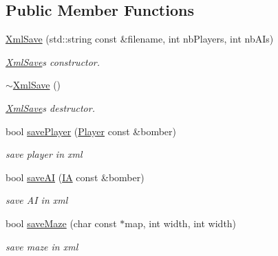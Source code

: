 \subsection*{Public Member Functions}
\begin{DoxyCompactItemize}
\item 
\hyperlink{class_xml_save_a84029bc40fae8324d683821b9013b9f5}{Xml\+Save} (std\+::string const \&filename, int nb\+Players, int nb\+A\+Is)
\begin{DoxyCompactList}\small\item\em \hyperlink{class_xml_save}{Xml\+Save}\textquotesingle{}s constructor. \end{DoxyCompactList}\item 
\hypertarget{class_xml_save_a87ca85b8767070250050f04dc5d539a4}{}\hyperlink{class_xml_save_a87ca85b8767070250050f04dc5d539a4}{$\sim$\+Xml\+Save} ()\label{class_xml_save_a87ca85b8767070250050f04dc5d539a4}

\begin{DoxyCompactList}\small\item\em \hyperlink{class_xml_save}{Xml\+Save}\textquotesingle{}s destructor. \end{DoxyCompactList}\item 
bool \hyperlink{class_xml_save_a81baea0e33b9f7d85b1eed8e868cd0d8}{save\+Player} (\hyperlink{class_player}{Player} const \&bomber)
\begin{DoxyCompactList}\small\item\em save player in xml \end{DoxyCompactList}\item 
bool \hyperlink{class_xml_save_a33586de72e77757f2c8ec06f98666e9b}{save\+A\+I} (\hyperlink{class_i_a}{I\+A} const \&bomber)
\begin{DoxyCompactList}\small\item\em save A\+I in xml \end{DoxyCompactList}\item 
bool \hyperlink{class_xml_save_a25c1aef0c3bc8589dc7224c332a792a1}{save\+Maze} (char const $\ast$map, int width, int width)
\begin{DoxyCompactList}\small\item\em save maze in xml \end{DoxyCompactList}\end{DoxyCompactItemize}
